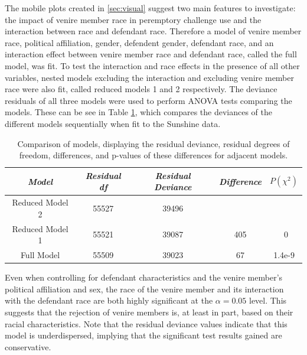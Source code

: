 \documentclass[12pt]{article}
\begin{document}
The mobile plots created in \ref{sec:visual} suggest two main features to investigate: the impact of venire member race in peremptory challenge use and the interaction between race and defendant race. Therefore a model of venire member race, political affiliation, gender, defendent gender, defendant race, and an interaction effect between venire member race and defendant race, called the full model, was fit. To test the interaction and race effects in the presence of all other variables, nested models excluding the interaction and excluding venire member race were also fit, called reduced models 1 and 2 respectively. The deviance residuals of all three models were used to perform ANOVA tests comparing the models. These can be see in Table \ref{tab:modcomp}, which compares the deviances of the different models sequentially when fit to the Sunshine data.

\begin{table}[h!]
  \centering
  \caption[Nested ANOVA Table Demonstrating the Importance of
  Race]{\footnotesize Comparison of models, displaying the residual deviance, residual degrees of freedom, differences, and p-values of these
    differences for adjacent models.}
  \label{tab:modcomp}
  \begin{tabular}{|c|c|c|c|c|} \hline
    \textit{Model} & \textit{Residual df} & \textit{Residual Deviance} & \textit{Difference} & $P(\chi^2)$ \\ \hline
    Reduced Model 2 & 55527 & 39496 &  &  \\
    Reduced Model 1 & 55521 & 39087 & 405 & ~0 \\
    Full Model & 55509 & 39023 & 67 & 1.4e-9 \\ \hline
  \end{tabular}
\end{table}

Even when controlling for defendant characteristics and the venire member's political affiliation and sex, the race of the venire member and its interaction with the defendant race are both highly significant at the $\alpha = 0.05$ level. This suggests that the rejection of venire members is, at least in part, based on their racial characteristics. Note that the residual deviance values indicate that this model is underdispersed, implying that the significant test results gained are conservative.
\end{document}
